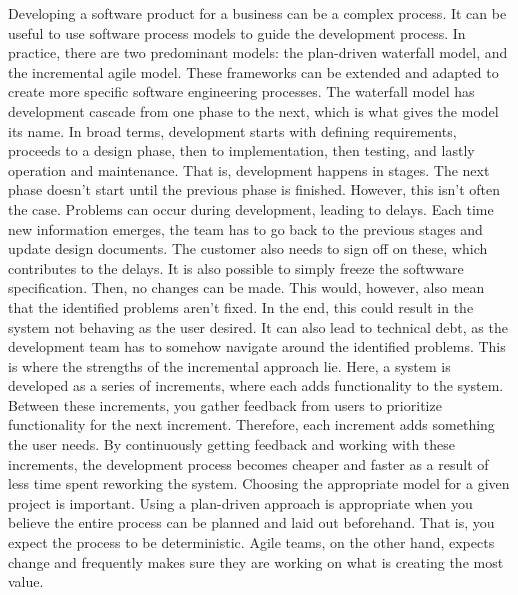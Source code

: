 
Developing a software product for a business can be a complex process.
It can be useful to use software process models to guide the development process.
In practice, there are two predominant models: the plan-driven waterfall model, and the incremental agile model.
These frameworks can be extended and adapted to create more specific software engineering processes.
The waterfall model has development cascade from one phase to the next, which is what gives the model its name.
In broad terms, development starts with defining requirements, proceeds to a design phase, then to implementation, then testing, and lastly operation and maintenance.
That is, development happens in stages. The next phase doesn't start until the previous phase is finished.
However, this isn't often the case. Problems can occur during development, leading to delays. Each time new information emerges, the team has to go back to the previous stages and update design documents. The customer also needs to sign off on these, which contributes to the delays.
It is also possible to simply freeze the softwware specification. Then, no changes can be made. This would, however, also mean that the identified problems aren't fixed. In the end, this could result in the system not behaving as the user desired. It can also lead to technical debt, as the development team has to somehow navigate around the identified problems.
This is where the strengths of the incremental approach lie. Here, a system is developed as a series of increments, where each adds functionality to the system. Between these increments, you gather feedback from users to prioritize functionality for the next increment. Therefore, each increment adds something the user needs.
By continuously getting feedback and working with these increments, the development process becomes cheaper and faster as a result of less time spent reworking the system.\cite{sommervilleSoftwareEngineering2016}
Choosing the appropriate model for a given project is important.
Using a plan-driven approach is appropriate when you believe the entire process can be planned and laid out beforehand. That is, you expect the process to be deterministic.
Agile teams, on the other hand, expects change and frequently makes sure they are working on what is creating the most value.


